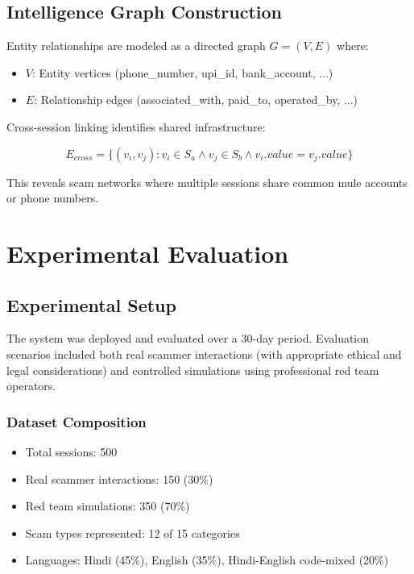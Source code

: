\documentclass[conference]{IEEEtran}
\begin{document}
\subsection{Intelligence Graph Construction}

Entity relationships are modeled as a directed graph $G = (V, E)$ where:
\begin{itemize}
    \item $V$: Entity vertices (phone\_number, upi\_id, bank\_account, ...)
    \item $E$: Relationship edges (associated\_with, paid\_to, operated\_by, ...)
\end{itemize}

Cross-session linking identifies shared infrastructure:

\begin{equation}
E_{cross} = \{(v_i, v_j) : v_i \in S_a \land v_j \in S_b \land v_i.value = v_j.value\}
\end{equation}

This reveals scam networks where multiple sessions share common mule accounts or phone numbers.

\section{Experimental Evaluation}

\subsection{Experimental Setup}

The system was deployed and evaluated over a 30-day period. Evaluation scenarios included both real scammer interactions (with appropriate ethical and legal considerations) and controlled simulations using professional red team operators.

\subsubsection{Dataset Composition}
\begin{itemize}
    \item Total sessions: 500
    \item Real scammer interactions: 150 (30\%)
    \item Red team simulations: 350 (70\%)
    \item Scam types represented: 12 of 15 categories
    \item Languages: Hindi (45\%), English (35\%), Hindi-English code-mixed (20\%)
\end{itemize}
\end{document}

